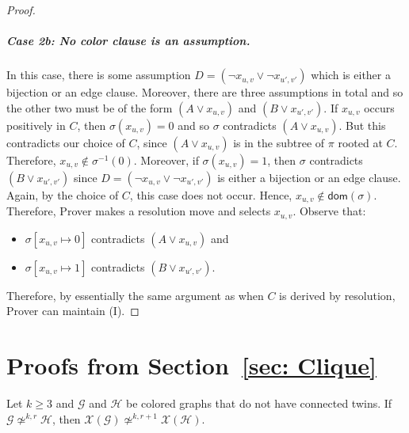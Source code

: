 \documentclass[a4paper,english, thm-restate]{lipics-v2021}
\newcommand{\graphG}{\mathcal{G}}
\newcommand{\graphH}{\mathcal{H}}
\newcommand{\dom}{\mathsf{dom}}
\newcommand{\graphXG}{\mathcal{X}(\mathcal{G})}
\newcommand{\graphXH}{\mathcal{X}(\mathcal{H})}
\newcommand{\notkequivr}[2]{\not\simeq^{#1,#2}}
\begin{document}
\begin{proof}
\subparagraph{Case 2b: No color clause is an assumption.} In this case, there is some assumption $D= (\neg x_{u,v} \vee \neg x_{u',v'})$ which is either a bijection or an edge clause. Moreover, there are three assumptions in total and so the other two must be of the form $(A \vee x_{u,v})$ and $(B \vee x_{u',v'})$. If $x_{u,v}$ occurs positively in $C$, then $\sigma(x_{u,v}) =0$ and so $\sigma$ contradicts $(A \vee x_{u,v})$. But this contradicts our choice of $C$, since $(A \vee x_{u,v})$ is in the subtree of $\pi$ rooted at $C$. Therefore, $x_{u,v} \not \in \sigma^{-1}(0)$. Moreover, if $\sigma(x_{u,v}) = 1$, then $\sigma$ contradicts $(B \vee x_{u',v'}) $ since $D = (\neg x_{u,v} \vee \neg x_{u',v'})$ is either a bijection or an edge clause. Again, by the choice of $C$, this case does not occur. Hence, $x_{u,v} \not \in \dom(\sigma)$. 
Therefore, Prover makes a resolution move and selects $x_{u,v}$. Observe that:
\begin{itemize}
\item  $\sigma [x_{u,v} \mapsto 0]$ contradicts $(A \vee x_{u,v})$ and
\item $\sigma [x_{u,v} \mapsto 1]$ contradicts $(B \vee x_{u',v'})$.
\end{itemize} 
Therefore, by essentially the same argument as when $C$ is derived by resolution, Prover can maintain (I).
\end{proof} 
\section{Proofs from Section~\ref{sec: Clique} \label{a: duplicator_to_delayer}}

\begin{lemma}
Let $k \ge 3$ and $\graphG$ and $\graphH$ be colored graphs that do not have connected twins.
If $\graphG \notkequivr{k}{r} \graphH$, then $\graphXG \notkequivr{k}{r+1} \! \graphXH$. 
\end{lemma}
\end{document}
